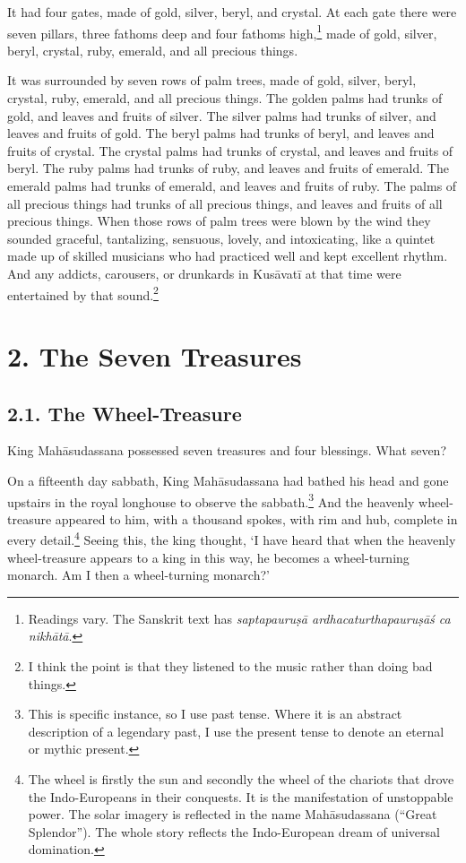 \documentclass[12pt,openany]{book}%
\begin{document}
It had four gates, made of gold, silver, beryl, and crystal. At each gate there were seven pillars, three fathoms deep and four fathoms high,\footnote{Readings vary. The Sanskrit text has \textit{\textsanskrit{saptapauruṣā} \textsanskrit{ardhacaturthapauruṣāś} ca \textsanskrit{nikhātā}}. } made of gold, silver, beryl, crystal, ruby, emerald, and all precious things. 

It was surrounded by seven rows of palm trees, made of gold, silver, beryl, crystal, ruby, emerald, and all precious things. The golden palms had trunks of gold, and leaves and fruits of silver. The silver palms had trunks of silver, and leaves and fruits of gold. The beryl palms had trunks of beryl, and leaves and fruits of crystal. The crystal palms had trunks of crystal, and leaves and fruits of beryl. The ruby palms had trunks of ruby, and leaves and fruits of emerald. The emerald palms had trunks of emerald, and leaves and fruits of ruby. The palms of all precious things had trunks of all precious things, and leaves and fruits of all precious things. When those rows of palm trees were blown by the wind they sounded graceful, tantalizing, sensuous, lovely, and intoxicating, like a quintet made up of skilled musicians who had practiced well and kept excellent rhythm. And any addicts, carousers, or drunkards in \textsanskrit{Kusāvatī} at that time were entertained by that sound.\footnote{I think the point is that they listened to the music rather than doing bad things. } 

\section*{2. The Seven Treasures }

\subsection*{2.1. The Wheel-Treasure }

King \textsanskrit{Mahāsudassana} possessed seven treasures and four blessings. What seven? 

On a fifteenth day sabbath, King \textsanskrit{Mahāsudassana} had bathed his head and gone upstairs in the royal longhouse to observe the sabbath.\footnote{This is specific instance, so I use past tense. Where it is an abstract description of a legendary past, I use the present tense to denote an eternal or mythic present. } And the heavenly wheel-treasure appeared to him, with a thousand spokes, with rim and hub, complete in every detail.\footnote{The wheel is firstly the sun and secondly the wheel of the chariots that drove the Indo-Europeans in their conquests. It is the manifestation of unstoppable power. The solar imagery is reflected in the name \textsanskrit{Mahāsudassana} (“Great Splendor”). The whole story reflects the Indo-European dream of universal domination. } Seeing this, the king thought, ‘I have heard that when the heavenly wheel-treasure appears to a king in this way, he becomes a wheel-turning monarch. Am I then a wheel-turning monarch?’ 
\end{document}
